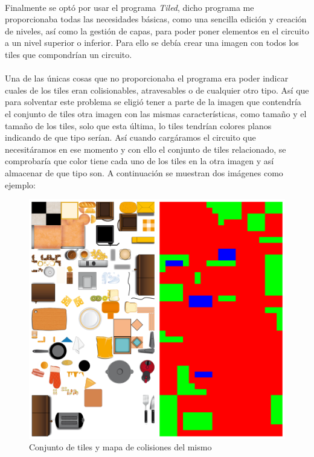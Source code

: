 \documentclass[a4paper,11pt]{article} %
\begin{document}
\paragraph{}
Finalmente se optó por usar el programa \emph{Tiled}, dicho programa me proporcionaba todas las necesidades básicas, como una 
sencilla edición y creación de niveles, así como la gestión de capas, para poder poner elementos en el circuito a un nivel 
superior o inferior. Para ello se debía crear una imagen con todos los tiles que compondrían un circuito.

\paragraph{}
Una de las únicas cosas que no proporcionaba el programa era poder indicar cuales de los tiles eran colisionables, atravesables o
de cualquier otro tipo. Así que para solventar este problema se eligió tener a parte de la imagen que contendría el conjunto de 
tiles otra imagen con las mismas características, como tamaño y el tamaño de los tiles, solo que esta última, lo tiles tendrían 
colores planos indicando de que tipo serían. Así cuando cargáramos el circuito
que necesitáramos en ese momento y con ello
el conjunto de tiles relacionado, se comprobaría que color tiene cada uno de los tiles en la otra imagen y así almacenar
de que tipo son. A continuación se muestran dos imágenes como ejemplo:

\begin{figure}[H]
  \label{tileset}
  \begin{center}
    \includegraphics[scale=0.245]{imagenes/tileset-collisionmap.png}
  \end{center}
  \caption{Conjunto de tiles y mapa de colisiones del mismo}
\end{figure}
\end{document}

